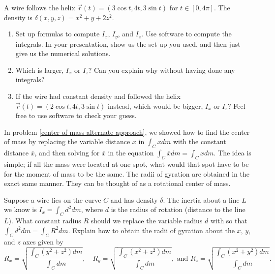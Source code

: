 
\begin{problem}
 A wire follows the helix $\vec r(t) = (3\cos t, 4t, 3\sin t)$ for $t\in[0,4\pi]$. The density is $\delta(x,y,z) = x^2+y+2z^2$. 
\begin{enumerate}
 \item Set up formulas to compute $I_x$, $I_y$, and $I_z$. Use software to compute the integrals. In your presentation, show us the set up you used, and then just give us the numerical solutions. 
 \item Which is larger, $I_x$ or $I_z$? Can you explain why without having done any integrals?
 \item {}%



If the wire had constant density and followed the helix $\vec r(t) = (2\cos t, 4t, 3\sin t)$ instead, which would be bigger, $I_x$ or $I_z$?  Feel free to use software to check your guess. 
\end{enumerate}
\end{problem}


 In problem \ref{center of mass alternate approach}, we showed how to find the center of mass by replacing the variable distance $x$ in $\int_C x dm$ with the constant distance $\bar x$, and then solving for $\bar x$ in the equation $\int_C \bar xdm = \int_C x dm$. The idea is simple; if all the mass were located at one spot, what would that spot have to be for the moment of mass to be the same.  The radii of gyration are obtained in the exact same manner.  They can be thought of as a rotational center of mass.
\begin{problem}%
%
Suppose a wire lies on the curve $C$ and has density $\delta$. The inertia about a line $L$ we know is $I_x=\int_C d^2 dm$, where $d$ is the radius of rotation (distance to the line $L$).  What constant radius $R$ should we replace the variable radius $d$ with so that $\int_C d^2 dm = \int_C R^2 dm$.  Explain how to obtain the radii of gyration about the $x$, $y$, and $z$ axes given by 
$$
R_x = \sqrt{\frac{\int_C (y^2+z^2)dm}{\int_C dm}},\quad
R_y = \sqrt{\frac{\int_C (x^2+z^2)dm}{\int_C dm}},
\text{ and }
R_z = \sqrt{\frac{\int_C (x^2+y^2)dm}{\int_C dm}}.
$$
\end{problem}

